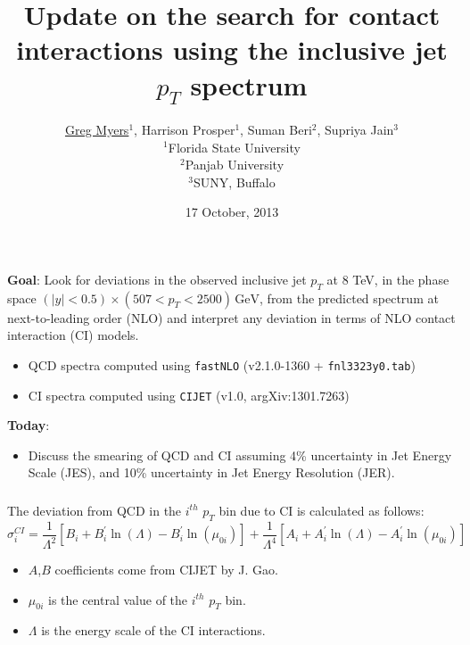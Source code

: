 \documentclass{beamer}
\title{Update on the search for contact interactions using the inclusive jet $p_T$ spectrum}
\author{ \underline{Greg Myers}$^{1}$, Harrison Prosper$^{1}$, Suman Beri$^{2}$, Supriya Jain$^{3}$ \\ $^{1}$Florida State University \\$^{2}$Panjab University \\$^{3}$SUNY, Buffalo}
\date{17 October, 2013}
\newcommand\BLUE[1]{\textcolor[rgb]{0,0,0.85}{\textbf{#1}}}
\begin{document}
\frame{\titlepage}

\begin{frame}
	\frametitle{}
	\BLUE{Goal}: Look for deviations in the observed inclusive jet $p_T$ at 8 TeV, in the phase space $(|y| < 0.5) \times (507 < p_T <  2500) \, \textrm{GeV}$, from the predicted spectrum at next-to-leading order (NLO) and interpret any deviation in terms of NLO contact interaction (CI) models.\\
	\begin{itemize}
	\item QCD spectra computed using {\tt fastNLO} (v2.1.0-1360 + {\tt fnl3323y0.tab})
	\item CI spectra computed using {\tt CIJET} (v1.0, argXiv:1301.7263)
	\end{itemize}
	\BLUE{Today}:
	\begin{itemize}
		\item Discuss the smearing of QCD and CI assuming 4\% uncertainty in Jet Energy Scale (JES), and 10\% uncertainty in Jet Energy Resolution (JER).
	\end{itemize}
\end{frame}

\begin{frame}
	\frametitle{}
	The deviation from QCD in the $i^{th}$  $p_{T}$ bin due to CI is calculated as follows:
\[ \sigma^{CI}_{i} =  \frac{1}{\Lambda^{2}}\left[ B_i + B_{i}^{\prime}\ln\left( \Lambda \right) - B_{i}^{\prime}\ln\left( \mu_{0i} \right) \right] +  \frac{1}{\Lambda^{4}}\left[ A_i + A_{i}^{\prime}\ln\left( \Lambda \right) - A_{i}^{\prime}\ln\left( \mu_{0i} \right) \right] \]
	
	\begin{itemize}
		\item $A$,$B$ coefficients come from CIJET by J. Gao.
		\item $\mu_{0i}$ is the central value of the $i^{th}$  $p_T$ bin.
		\item $\Lambda$ is the energy scale of the CI interactions.
	\end{itemize}
\end{frame}
\end{document}
